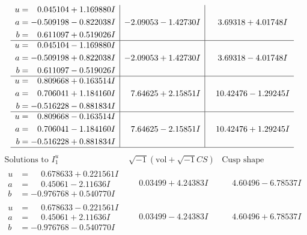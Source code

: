 \documentclass[1p]{elsarticle_modified}
\theoremstyle{definition}
\newcommand{\I}{\sqrt{-1}}
\begin{document}
$$\begin{array}{c|c|c}
\begin{aligned}
u &= \phantom{-}0.045104 + 1.169880 I \\
a &= -0.509198 - 0.822038 I \\
b &= \phantom{-}0.611097 + 0.519026 I\end{aligned}
 & -2.09053 - 1.42730 I & \phantom{-}3.69318 + 4.01748 I \\ \hline\begin{aligned}
u &= \phantom{-}0.045104 - 1.169880 I \\
a &= -0.509198 + 0.822038 I \\
b &= \phantom{-}0.611097 - 0.519026 I\end{aligned}
 & -2.09053 + 1.42730 I & \phantom{-}3.69318 - 4.01748 I \\ \hline\begin{aligned}
u &= \phantom{-}0.809668 + 0.163514 I \\
a &= \phantom{-}0.706041 + 1.184160 I \\
b &= -0.516228 - 0.881834 I\end{aligned}
 & \phantom{-}7.64625 + 2.15851 I & \phantom{-}10.42476 - 1.29245 I \\ \hline\begin{aligned}
u &= \phantom{-}0.809668 - 0.163514 I \\
a &= \phantom{-}0.706041 - 1.184160 I \\
b &= -0.516228 + 0.881834 I\end{aligned}
 & \phantom{-}7.64625 - 2.15851 I & \phantom{-}10.42476 + 1.29245 I\\
 \hline 
 \end{array}$$\newpage$$\begin{array}{c|c|c}  
\text{Solutions to }I^u_{1}& \I (\text{vol} + \sqrt{-1}CS) & \text{Cusp shape}\\
 \hline 
\begin{aligned}
u &= \phantom{-}0.678633 + 0.221561 I \\
a &= \phantom{-}0.45061 - 2.11636 I \\
b &= -0.976768 + 0.540770 I\end{aligned}
 & \phantom{-}0.03499 + 4.24383 I & \phantom{-}4.60496 - 6.78537 I \\ \hline\begin{aligned}
u &= \phantom{-}0.678633 - 0.221561 I \\
a &= \phantom{-}0.45061 + 2.11636 I \\
b &= -0.976768 - 0.540770 I\end{aligned}
 & \phantom{-}0.03499 - 4.24383 I & \phantom{-}4.60496 + 6.78537 I \\ \hline\begin{aligned}

\end{aligned}
\end{array}$$
\end{document}
